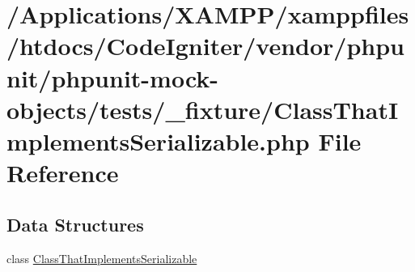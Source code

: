 \hypertarget{_class_that_implements_serializable_8php}{}\section{/\+Applications/\+X\+A\+M\+P\+P/xamppfiles/htdocs/\+Code\+Igniter/vendor/phpunit/phpunit-\/mock-\/objects/tests/\+\_\+fixture/\+Class\+That\+Implements\+Serializable.php File Reference}
\label{_class_that_implements_serializable_8php}
\subsection*{Data Structures}
\begin{DoxyCompactItemize}
\item 
class \mbox{\hyperlink{class_class_that_implements_serializable}{Class\+That\+Implements\+Serializable}}
\end{DoxyCompactItemize}
